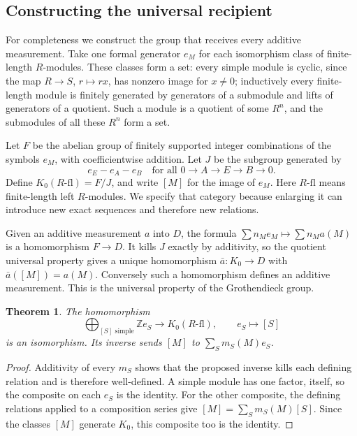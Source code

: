 \documentclass[11pt]{article}
\newtheorem{theorem}{Theorem}[section]
\theoremstyle{definition}
\theoremstyle{remark}\newtheorem{remark}[theorem]{Remark}
\begin{document}
\subsection{Constructing the universal recipient}

For completeness we construct the group that receives every additive
measurement. Take one formal generator $e_M$ for each isomorphism
class of finite-length $R$-modules. These classes form a set: every
simple module is cyclic, since the map $R\to S$, $r\mapsto rx$, has
nonzero image for $x\ne0$; inductively every finite-length module is
finitely generated by generators of a submodule and lifts of generators
of a quotient. Such a module is a quotient of some $R^n$, and the
submodules of all these $R^n$ form a set.

Let $F$ be the abelian group of finitely supported integer combinations
of the symbols $e_M$, with coefficientwise addition. Let $J$ be the
subgroup generated by
\[
 e_E-e_A-e_B
 \quad\text{for all }0\to A\to E\to B\to0.
\]
Define $K_0(R\text{-}\mathrm{fl})=F/J$, and write $[M]$ for the
image of $e_M$. Here $R\text{-}\mathrm{fl}$ means finite-length
left $R$-modules. We specify that category because enlarging it can
introduce new exact sequences and therefore new relations.

Given an additive measurement $a$ into $D$, the formula
$\sum n_Me_M\mapsto\sum n_Ma(M)$ is a homomorphism $F\to D$.
It kills $J$ exactly by additivity, so the quotient universal property
gives a unique homomorphism $\bar a:K_0\to D$ with $\bar a([M])=a(M)$.
Conversely such a homomorphism defines an additive measurement.
This is the universal property of the Grothendieck group.

\begin{theorem}\label{k:free-simples}
The homomorphism
\[
 \bigoplus_{[S]\text{ simple}}\mathbb Z e_S\longrightarrow
 K_0(R\text{-}\mathrm{fl}),\qquad e_S\longmapsto[S]
\]
is an isomorphism. Its inverse sends $[M]$ to
$\sum_Sm_S(M)e_S$.
\end{theorem}
\begin{proof}
Additivity of every $m_S$ shows that the proposed inverse kills each
defining relation and is therefore well-defined. A simple module has
one factor, itself, so the composite on each $e_S$ is the identity.
For the other composite, the defining relations applied to a composition
series give $[M]=\sum_Sm_S(M)[S]$. Since the classes $[M]$ generate
$K_0$, this composite too is the identity.
\end{proof}
\end{document}
